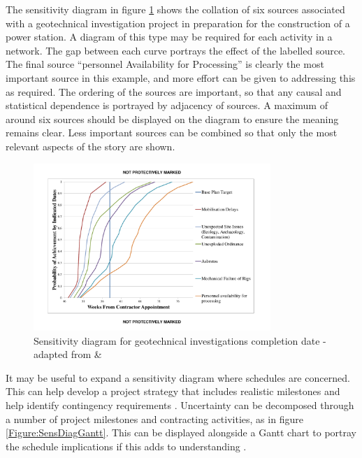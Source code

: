 The sensitivity diagram in figure \ref{Figure:SensDiag} shows the collation of six sources associated with a geotechnical investigation project in preparation for the construction of a power station.
A diagram of this type may be required for each activity in a network.
The gap between each curve portrays the effect of the labelled source.
The final source ``personnel Availability for Processing'' is clearly the most important source in this example, and more effort can be given to addressing this as required. 
The ordering of the sources are important, so that any causal and statistical dependence is portrayed by adjacency of sources.
A maximum of around six sources should be displayed on the diagram to ensure the meaning remains clear.
Less important sources can be combined so that only the most relevant aspects of the story are shown.

\begin{figure}[!h]
  \centering
    \includegraphics[width = 0.8\textwidth]{./Figures/Sensitivity_Diagram.pdf} 
\caption{Sensitivity diagram for geotechnical investigations completion date - adapted from \cite{chapman} \& \cite{hopkinson2008}}
\label{Figure:SensDiag}
\end{figure}

It may be useful to expand a sensitivity diagram where schedules are concerned. 
This can help develop a project strategy that includes realistic milestones and help identify contingency requirements \citep{hopkinson2008}.
Uncertainty can be decomposed through a number of project milestones and contracting activities, as in figure \ref{Figure:SensDiagGantt}.
This can be displayed alongside a Gantt chart to portray the schedule implications if this adds to understanding \citep{hopkinson2008}.

